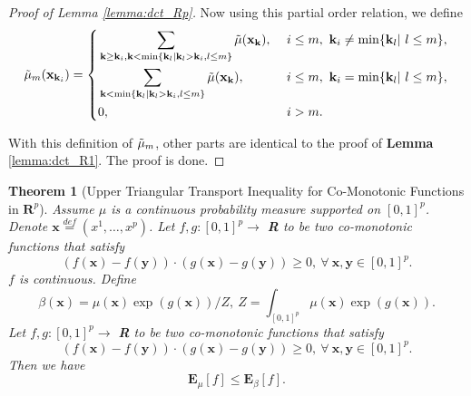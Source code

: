 \documentclass[nohyperref]{article}
\theoremstyle{plain}
\newtheorem{Theorem}{\textbf{Theorem}}
\begin{document}
\begin{proof}[Proof of Lemma \ref{lemma:dct_Rp}]
Now using this partial order relation, we define 
\begin{equation*}
    \Tilde{\mu}_m (\textbf{x}_{\textbf{k}_i}) = 
    \left\{
    \begin{aligned}
        &\sum_{\textbf{k} \geq \textbf{k}_i, \textbf{k} < \min \{ \textbf{k}_l | \textbf{k}_l > \textbf{k}_i, l \leq m \} } \Tilde{\mu} (\textbf{x}_{\textbf{k}}) 
        ,& &\ i \leq m,\ \textbf{k}_i \neq \min\{ \textbf{k}_l |\ l \leq m \}, \\
        &\sum_{\textbf{k} < \min\{ \textbf{k}_l | \textbf{k}_l > \textbf{k}_i, l \leq m \} } \Tilde{\mu} (\textbf{x}_{\textbf{k}})     
        ,& &\ i \leq m,\ \textbf{k}_i = \min\{\textbf{k}_l |\ l \leq m \}, \\
        &0         ,& &\  i > m. \\
    \end{aligned}
    \right.
\end{equation*}

With this definition of $\Tilde{\mu}_m$, other parts are identical to the proof of \textbf{Lemma} \ref{lemma:dct_R1}.
The proof is done.

\end{proof}

\begin{Theorem}[Upper Triangular Transport Inequality for Co-Monotonic Functions in $\mathbf{R}^p$]
Assume $\mu$ is a continuous probability measure supported on $[0, 1]^p$. 
Denote $\textbf{x} \overset{def}{=} (x^1, \dots, x^p)$.
Let $f, g: [0, 1]^p \rightarrow $ \textbf{R} to be two co-monotonic functions that satisfy
$$(f(\textbf{x})
- f(\textbf{y})) 
\cdot (g(\textbf{x}) 
- g(\textbf{y})) \geq 0, \ \forall \ \textbf{x}, \textbf{y} \in [0, 1]^p.$$
$f$ is continuous.
Define 
$$\beta(\textbf{x}) 
= \mu(\textbf{x}) \exp(g(\textbf{x})) / Z,\  
Z = \int_{[0, 1]^p} \mu(\textbf{x}) \exp (g(\textbf{x})).$$ 
Let $f, g: [0, 1]^p \rightarrow $ \textbf{R} to be two co-monotonic functions that satisfy
$$(f(\textbf{x})
- f(\textbf{y})) 
\cdot (g(\textbf{x}) 
- g(\textbf{y})) \geq 0, \ \forall \ \textbf{x}, \textbf{y} \in [0, 1]^p.$$
Then we have
$$
\textbf{E}_{\mu} [f] \leq \textbf{E}_{\beta} [f].
$$
\label{thm:cts_Rp}
\end{Theorem}
\end{document}
